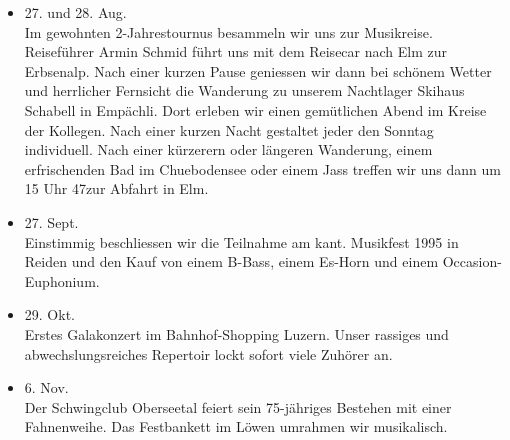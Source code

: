 \begin{history}
\begin{itemize}
        \item[]27. und 28. Aug.\\
        Im gewohnten 2-Jahrestournus besammeln wir uns zur Musikreise.
        Reiseführer Armin Schmid führt uns mit dem Reisecar nach Elm zur
        Erbsenalp. Nach einer kurzen Pause geniessen wir dann bei schönem Wetter
        und herrlicher Fernsicht die Wanderung zu unserem Nachtlager Skihaus
        Schabell in Empächli. Dort erleben wir einen gemütlichen Abend im Kreise
        der Kollegen. Nach einer kurzen Nacht gestaltet jeder den Sonntag
        individuell. Nach einer kürzerern oder längeren Wanderung, einem
        erfrischenden Bad im Chuebodensee oder einem Jass treffen wir uns dann
        um 15 Uhr 47zur Abfahrt in Elm.

        \item[]27. Sept.\\
        Einstimmig beschliessen wir die Teilnahme am kant. Musikfest 1995 in
        Reiden und den Kauf von einem B-Bass, einem Es-Horn und einem
        Occasion-Euphonium.

        \item[]29. Okt.\\
        Erstes Galakonzert im Bahnhof-Shopping Luzern. Unser rassiges und
        abwechslungsreiches Repertoir lockt sofort viele Zuhörer an.

        \item[]6. Nov.\\
        Der Schwingclub Oberseetal feiert sein 75-jähriges Bestehen mit einer
        Fahnenweihe. Das Festbankett im Löwen umrahmen wir musikalisch.

    \end{itemize}

\end{history}
